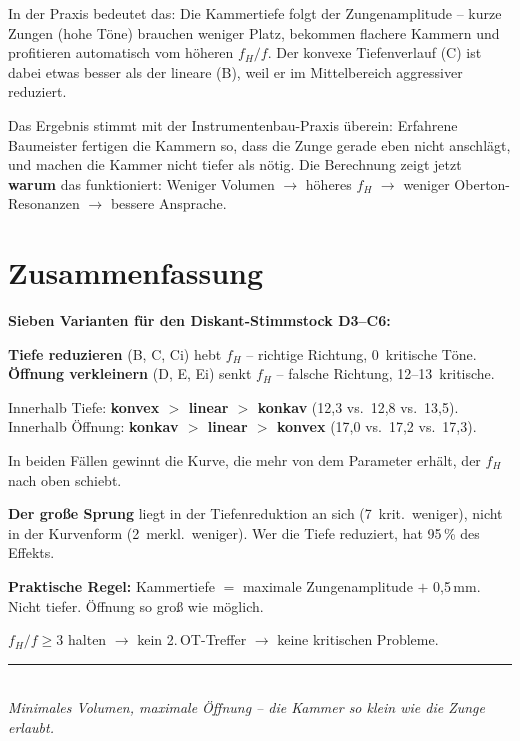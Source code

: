 \documentclass[11pt,a4paper]{article}
\begin{document}
In der Praxis bedeutet das: Die Kammertiefe folgt der Zungenamplitude -- kurze Zungen (hohe Töne) brauchen weniger Platz, bekommen flachere Kammern und profitieren automatisch vom höheren $f_H/f$. Der konvexe Tiefenverlauf (C) ist dabei etwas besser als der lineare (B), weil er im Mittelbereich aggressiver reduziert.

Das Ergebnis stimmt mit der Instrumentenbau-Praxis überein: Erfahrene Baumeister fertigen die Kammern so, dass die Zunge gerade eben nicht anschlägt, und machen die Kammer nicht tiefer als nötig. Die Berechnung zeigt jetzt \textbf{warum} das funktioniert: Weniger Volumen $\to$ höheres $f_H$ $\to$ weniger Oberton-Resonanzen $\to$ bessere Ansprache.


\section{Zusammenfassung}

\begin{keybox}
\textbf{Sieben Varianten für den Diskant-Stimmstock D3--C6:}

\textbf{Tiefe reduzieren} (B, C, Ci) hebt $f_H$ -- richtige Richtung, 0~kritische Töne.\\
\textbf{Öffnung verkleinern} (D, E, Ei) senkt $f_H$ -- falsche Richtung, 12--13~kritische.

Innerhalb Tiefe: \textbf{konvex $>$ linear $>$ konkav} (12{,}3 vs.\ 12{,}8 vs.\ 13{,}5).\\
Innerhalb Öffnung: \textbf{konkav $>$ linear $>$ konvex} (17{,}0 vs.\ 17{,}2 vs.\ 17{,}3).

In beiden Fällen gewinnt die Kurve, die mehr von dem Parameter erhält, der $f_H$ nach oben schiebt.

\textbf{Der große Sprung} liegt in der Tiefenreduktion an sich (7~krit.\ weniger), nicht in der Kurvenform (2~merkl.\ weniger). Wer die Tiefe reduziert, hat 95\,\% des Effekts.

\textbf{Praktische Regel:} Kammertiefe $=$ maximale Zungenamplitude $+$ 0{,}5\,mm. Nicht tiefer. Öffnung so groß wie möglich.

$f_H/f \geq 3$ halten $\to$ kein 2.\,OT-Treffer $\to$ keine kritischen Probleme.
\end{keybox}

\vspace{3mm}
\begin{center}
\textcolor{accentred}{\rule{0.6\textwidth}{1pt}}\\[4pt]
{\small\itshape Minimales Volumen, maximale Öffnung -- die Kammer so klein wie die Zunge erlaubt.}
\end{center}
\end{document}
